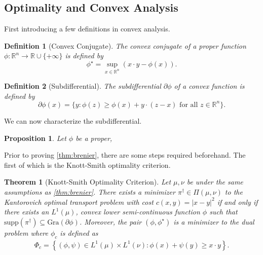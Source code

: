 \documentclass[12pt]{article}
\newcommand{\R}{\mathbb{R}}
\theoremstyle{plain}
\newtheorem{thm}{Theorem}[section]
\newtheorem{prop}{Proposition}[section]
\newtheorem{defn}{Definition}[section]
\numberwithin{equation}{section}
\begin{document}
\subsection{Optimality and Convex Analysis}
First introducing a few definitions in convex analysis.
\begin{defn}[Convex Conjugate]
  The convex conjugate of a proper function $\phi: \R^n\to\R\cup\{+\infty\}$ is defined by 
  \[\phi^\star = \sup_{x\in\R^n}(x\cdot y - \phi(x)).\]
\end{defn}
\begin{defn}[Subdifferential]
  The subdifferential $\partial \phi$ of a convex function is defined by 
  \[\partial \phi(x) = \{y : \phi(z)\ge \phi(x) + y\cdot(z-x)\text{ for all $z\in \R^n$}\}.\]
\end{defn}
We can now characterize the subdifferential.
\begin{prop}
  Let $\phi$ be a proper, 
\end{prop}
Prior to proving \autoref{thm:brenier}, there are some steps required beforehand. The first of which is the Knott-Smith optimality criterion.
\begin{thm}[Knott-Smith Optimality Criterion]
  Let $\mu,\nu$ be under the same assumptions as \autoref{thm:brenier}. There exists a minimizer $\pi^\dagger\in\Pi(\mu,\nu)$ to the Kantorovich optimal transport problem with cost $c(x,y) = |x-y|^2$ if and only if there exists 
  an $L^1(\mu)$, convex lower semi-continuous function $\phi$ such that $\text{supp}(\pi^\dagger)\subseteq \text{Gra}(\partial \phi)$. Moreover, 
  the pair $(\phi,\phi^\star)$ is a minimizer to the dual problem where $\phi_c$ is defined as 
  \begin{align*}
    \Phi_c = \left\{(\phi,\psi) \in L^1(\mu)\times L^1(\nu) : \phi(x)+\psi(y) \ge x\cdot y\right\}.
  \end{align*}
\end{thm}
\end{document}
